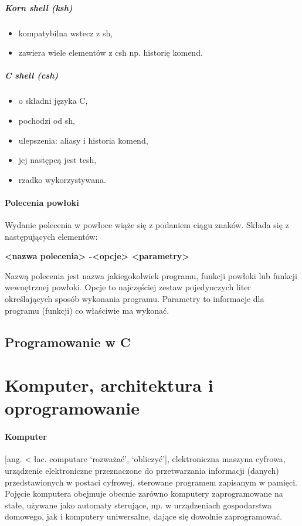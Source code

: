 \documentclass[]{report}
\begin{document}
\subparagraph{Korn shell (ksh)}
\begin{itemize}
\item kompatybilna wstecz z sh,
\item zawiera wiele elementów z csh np. historię komend.
\end{itemize}


\subparagraph{C shell (csh)}
\begin{itemize}
\item o składni języka C,
\item pochodzi od sh,
\item ulepszenia: aliasy i historia komend,
\item jej następcą jest tcsh,
\item rzadko wykorzystywana.
\end{itemize}

\paragraph{Polecenia powłoki\\}

Wydanie polecenia w powłoce wiąże się z podaniem ciągu znaków. Składa się z następujących elementów:
\begin{center}\textbf{<nazwa polecenia> -<opcje> <parametry>}\end{center}

Nazwą polecenia jest nazwa jakiegokolwiek programu, funkcji powłoki lub funkcji   wewnętrznej powłoki. Opcje to najczęściej zestaw pojedynczych liter określających     sposób wykonania programu. Parametry to informacje dla programu (funkcji) co   właściwie ma wykonać.

\subsection{Programowanie w C}

\section{Komputer, architektura i oprogramowanie}
\paragraph{Komputer} [ang. < łac. computare ‘rozważać’, ‘obliczyć’], elektroniczna maszyna cyfrowa, urządzenie elektroniczne przeznaczone do przetwarzania informacji (danych) przedstawionych w postaci cyfrowej, sterowane programem zapisanym w pamięci.
Pojęcie komputera obejmuje obecnie zarówno komputery zaprogramowane na stałe, używane jako automaty sterujące, np. w urządzeniach gospodarstwa domowego, jak i komputery uniwersalne, dające się dowolnie zaprogramować.
\end{document}
